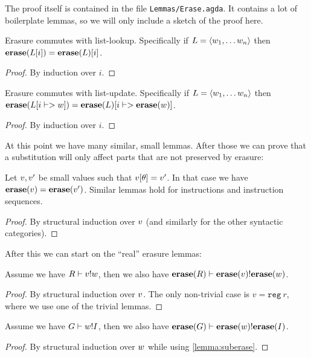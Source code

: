 The proof itself is contained in the file \texttt{Lemmas/Erase.agda}. It
contains a lot of boilerplate lemmas, so we will only include a sketch of the
proof here.

\begin{lemma}
  Erasure commutes with list-lookup. Specifically if
  $L = \langle w_1, \dots w_n \rangle$ then
  ${\mathbf{erase}}(L[i]) = {\mathbf{erase}}(L)[i]$.
\end{lemma}
\begin{proof}
  By induction over $i$.
\end{proof}

\begin{lemma}
  Erasure commutes with list-update. Specifically if
  $L = \langle w_1, \dots w_n \rangle$ then
  ${\mathbf{erase}}(L[i |-> w]) = {\mathbf{erase}}(L)[i |-> {\mathbf{erase}}(w)]$.
\end{lemma}
\begin{proof}
  By induction over $i$.
\end{proof}

At this point we have many similar, small lemmas. After those we can prove that
a substitution will only affect parts that are not preserved by erasure:

\begin{lemma}
  \label{lemma:suberase}
  Let $v, v'$ be small values such that
  $v[\theta] = v'$. In that case we have
  ${\mathbf{erase}}(v) = {\mathbf{erase}}(v')$. Similar lemmas hold for instructions and
  instruction sequences.
\end{lemma}
\begin{proof}
  By structural induction over $v$ (and similarly for the other syntactic
  categories).
\end{proof}

After this we can start on the ``real'' erasure lemmas:

\begin{lemma}
  Assume we have ${R} |- {v} ! {w}$, then we also have
  ${{\mathbf{erase}}(R)} |- {{\mathbf{erase}}(v)} ! {{\mathbf{erase}}(w)}$.
\end{lemma}
\begin{proof}
  By structural induction over $v$. The only non-trivial case is
  $v = \mathtt{reg}\ r$, where we use one of the trivial lemmas.
\end{proof}

\begin{lemma}
  Assume we have ${G} |- {w} ! {I}$, then we also have
  ${{\mathbf{erase}}(G)} |- {{\mathbf{erase}}(w)} ! {{\mathbf{erase}}(I)}$.
\end{lemma}
\begin{proof}
  By structural induction over $w$ while using \cref{lemma:suberase}.
\end{proof}


